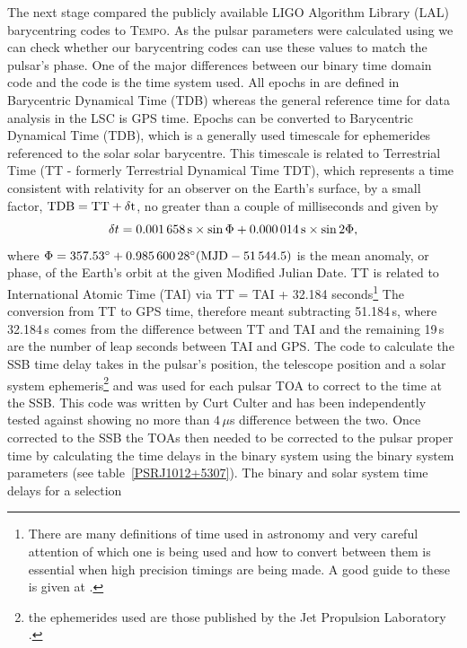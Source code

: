 The next stage compared the publicly available LIGO Algorithm Library (LAL) \cite{LAL}
barycentring codes to T\textsc{empo}. As the pulsar parameters were calculated using \tempo we can
check whether our barycentring codes can use these values to match the pulsar's phase. One of the
major differences between our binary time domain code and the \tempo code is the time system used.
All epochs in \tempo are defined in Barycentric Dynamical Time (TDB) whereas the general reference
time for \gw data analysis in the LSC is GPS time. Epochs can be converted to Barycentric
Dynamical Time (TDB), which is a generally used timescale for ephemerides referenced to the solar
solar barycentre. This timescale is related to Terrestrial Time (TT - formerly Terrestrial Dynamical
Time TDT), which represents a time consistent with relativity for an observer on the Earth's
surface, by a small factor, $\rm{TDB} = \rm{TT} + \delta{}t$, no greater than a couple of
milliseconds and given by
\begin{equation}
\delta{}t = 0.001\,658\,{\rm s}\times\sin{\Phi} + 0.000\,014\,{\rm s}\times\sin{2\Phi},
\end{equation}
where $\Phi = 357.53^{\circ} + 0.985\,600\,28^{\circ}(\rm{MJD} - 51\,544.5)$ is the mean anomaly, or
phase, of the Earth's orbit at the given Modified Julian Date. TT is related to International
Atomic Time (TAI) via TT = TAI + 32.184 seconds\footnote{There are many definitions of time used in
astronomy and very careful attention of which one is being used and how to convert between them is
essential when high precision timings are being made. A good guide to these is given at
\cite{Times}.} The conversion from TT to GPS time, therefore meant subtracting 51.184\,s, where
32.184\,s comes from the difference between TT and TAI and the remaining 19\,s are the number of
leap seconds between TAI and GPS. The code to calculate the SSB time delay takes in the pulsar's
position, the telescope position and a solar system ephemeris\footnote{the ephemerides used are
those published by the Jet Propulsion Laboratory \cite{JPLEphemeris}.} and was used for each pulsar
TOA to correct to the time at the SSB. This code was written by Curt Culter and has been
independently tested against \tempo \cite{Abbott:2004, Dupuis:2004} showing no more than $4\,\mu$s
difference between the two. Once corrected to the SSB the TOAs then needed to be corrected to the
pulsar proper time by calculating the time delays in the binary system using the binary system
parameters (see table~\ref{PSRJ1012+5307}). The binary and solar system time delays for a selection
